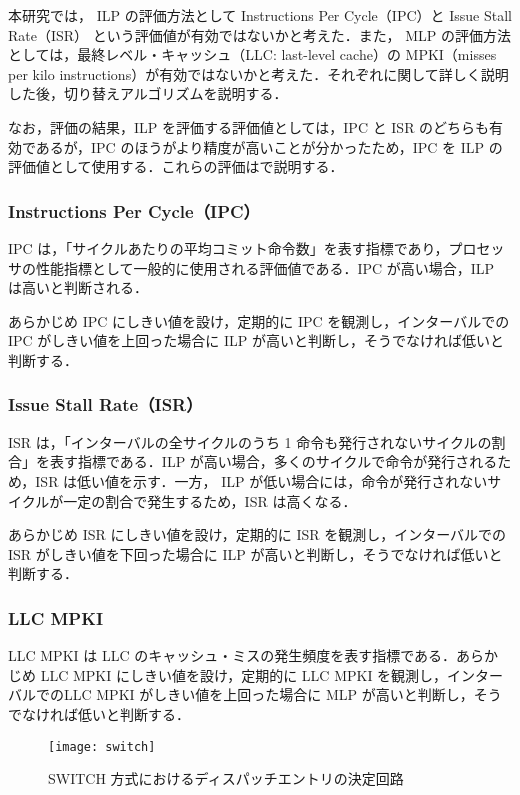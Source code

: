 本研究では， ILP の評価方法として Instructions Per Cycle（IPC）と Issue Stall Rate（ISR） という評価値が有効ではないかと考えた．また， MLP の評価方法としては，最終レベル・キャッシュ（LLC: last-level cache）の MPKI（misses per kilo instructions）が有効ではないかと考えた．それぞれに関して詳しく説明した後，切り替えアルゴリズムを説明する．

なお，評価の結果，ILP を評価する評価値としては，IPC と ISR のどちらも有効であるが，IPC のほうがより精度が高いことが分かったため，IPC を ILP の評価値として使用する．これらの評価はで説明する．

\subsubsection{Instructions Per Cycle（IPC）}
IPC は，「サイクルあたりの平均コミット命令数」を表す指標であり，プロセッサの性能指標として一般的に使用される評価値である．IPC が高い場合，ILP は高いと判断される．

あらかじめ IPC にしきい値を設け，定期的に IPC を観測し，インターバルでの IPC がしきい値を上回った場合に ILP が高いと判断し，そうでなければ低いと判断する．

\subsubsection{Issue Stall Rate（ISR）}
ISR は，「インターバルの全サイクルのうち 1 命令も発行されないサイクルの割合」を表す指標である．ILP が高い場合，多くのサイクルで命令が発行されるため，ISR は低い値を示す．一方， ILP が低い場合には，命令が発行されないサイクルが一定の割合で発生するため，ISR は高くなる．

あらかじめ ISR にしきい値を設け，定期的に ISR を観測し，インターバルでの ISR がしきい値を下回った場合に ILP が高いと判断し，そうでなければ低いと判断する．

\subsubsection{LLC MPKI}
LLC MPKI は LLC のキャッシュ・ミスの発生頻度を表す指標である．あらかじめ LLC MPKI にしきい値を設け，定期的に LLC MPKI を観測し，インターバルでのLLC MPKI がしきい値を上回った場合に MLP が高いと判断し，そうでなければ低いと判断する．

\begin{figure}[htb]
  \centering
  \texttt{[image: switch]}
  \caption{SWITCH 方式におけるディスパッチエントリの決定回路}
  \label{fig:switch}
\end{figure}

